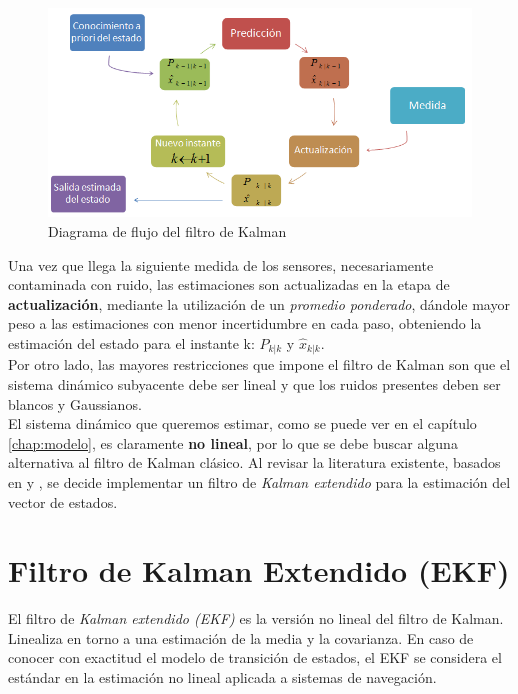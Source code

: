 \documentclass[main]{subfiles}
\begin{document}
\begin{figure}[h!]
	\centering
	\includegraphics[width=.8\textwidth]{./pics_kalman/kal.png}
	\caption{Diagrama de flujo del filtro de Kalman}
	\label{fig:kal}
\end{figure}

Una vez que llega la siguiente medida de los sensores, necesariamente contaminada con ruido, las estimaciones son actualizadas en la etapa de \textbf{actualización}, mediante la utilización de un \emph{promedio ponderado}, dándole mayor peso a las estimaciones con menor incertidumbre en cada paso, obteniendo la estimación del estado para el instante k: $P_{k|k}$ y $\hat{x}_{k|k}$.\\

Por otro lado, las mayores restricciones que impone el filtro de Kalman son que el sistema dinámico subyacente debe ser lineal y que los ruidos presentes deben ser blancos y Gaussianos.\\

El sistema dinámico que queremos estimar, como se puede ver en el capítulo \ref{chap:modelo}, es claramente \textbf{no lineal}, por lo que se debe buscar alguna alternativa al filtro de Kalman clásico. Al revisar la literatura existente, basados en \cite{bib:kalman} y \cite{bib:kalman2}, se decide implementar un filtro de \emph{Kalman extendido} para la estimación del vector de estados.

\section{Filtro de Kalman Extendido (EKF)}

El filtro de \emph{Kalman extendido (EKF)} es la versión no lineal del filtro de Kalman. Linealiza en torno a una estimación de la media y la covarianza. En caso de conocer con exactitud el modelo de transición de estados, el EKF se considera el estándar en la estimación no lineal aplicada a sistemas de navegación.\\
\end{document}
